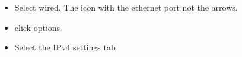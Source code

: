\documentclass{article}
\begin{document}
\begin{itemize}
\begin{center}
\end{center}
\item Select wired. The icon with the ethernet port not the arrows.
\item click options
\begin{center}
\end{center}
\item Select the IPv4 settings tab
\begin{center}

\end{center}
\end{itemize}
\end{document}
